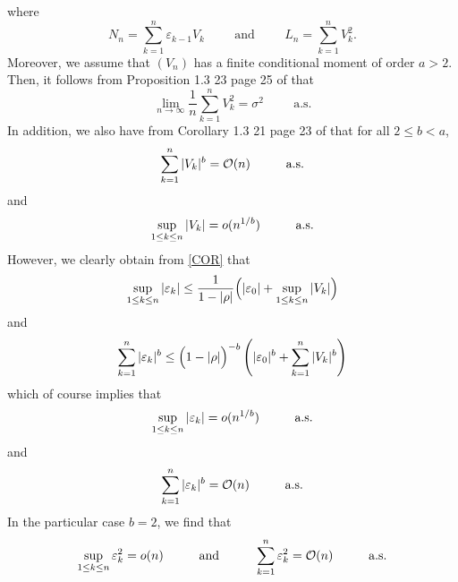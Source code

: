 \documentclass[article,12pt]{amsart}
\numberwithin{equation}{section}
\theoremstyle{plain}
\begin{document}
where
\begin{equation*} 
N_{n} =\sum_{k=1}^{n}{\varepsilon}_{k-1}V_k
\hspace{1cm}\text{and}\hspace{1cm}
L_{n} =\sum_{k=1}^{n}V_{k}^{2}.
\end{equation*} 
Moreover, we assume that $(V_n)$ has a finite conditional moment of order $a>2$. 
Then, it follows from Proposition 1.3 23 page 25 of \cite{Duflo} that
\begin{equation}
\label{SLLNV}
\lim_{n \rightarrow \infty}\frac{1}{n}\sum_{k=1}^{n}V_k^2=\sigma^2
\hspace{1cm} \text{a.s.}
\end{equation}
In addition, we also have from Corollary 1.3 21 page 23 of \cite{Duflo} that
for all $2\leq b<a$, 
\begin{equation}
\label{CVGV}
\sum_{k=1}^{n} |V_k|^b={\mathcal{O}}(n) \hspace{1cm}\textnormal{a.s.}
\end{equation}
and
\begin{equation}
\label{SUPV}
\sup_{1 \leq k \leq n}  |V_k|=o(n^{1/b}) \hspace{1cm}\textnormal{a.s.}
\end{equation}
However, we clearly obtain from \eqref{COR} that
\begin{equation}
\label{MAJNOISE}
\sup_{1 \leq k \leq n} |{\varepsilon}_k| \leq \frac{1}{1-|\rho |} \Bigl( |{\varepsilon}_0| + \sup_{1 \leq k \leq n} | V_{k} | \Bigr)
\end{equation}
and
 \begin{equation}
 \sum_{k=1}^{n} |{\varepsilon}_{k}|^b \leq 
 \Bigl(  1- | \rho | \Bigr)^{-b} \left(  |{\varepsilon}_0|^b  +  
 \sum_{k=1}^{n}  |V_{k}|^b \right)
\label{MAJSNOISE} 
 \end{equation}
which of course implies that
\begin{equation}
\label{SUPNOISE}
\sup_{1 \leq k \leq n} |{\varepsilon}_k|=o(n^{1/b}) \hspace{1cm}\textnormal{a.s.}
\end{equation}
and 
\begin{equation}
 \sum_{k=1}^{n} |{\varepsilon}_{k}|^b = {\mathcal{O}}(n) \hspace{1cm}\textnormal{a.s.}
\label{CVGNOISEB} 
 \end{equation}
In the particular case $b=2$, we find that
\begin{equation}
 \sup_{1 \leq k \leq n}  {\varepsilon}_{k}^2 = o(n) \hspace{1cm}\text{and}\hspace{1cm}
  \sum_{k=1}^{n} {\varepsilon}_{k}^2 = {\mathcal{O}}(n) \hspace{1cm}\textnormal{a.s.}
\label{RESNOISE2} 
 \end{equation} 
\end{document}
